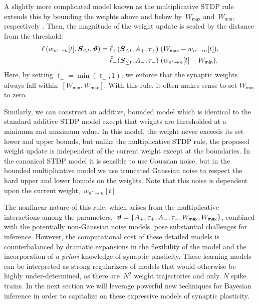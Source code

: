 A slightly more complicated model known as the multiplicative STDP
rule extends this by bounding the weights above and below
by~$W_{\mathsf{max}}$ and~$W_{\mathsf{min}}$, respectively
\citep{Morrison-2008}. Then, the magnitude of the weight update is
scaled by the distance from the threshold:
\begin{align}
 \label{eqn:MultSTDP}
 \ell\left(w_{n' \to n}[t], \boldsymbol{S}_{\leq t}, \boldsymbol{\vartheta} \right) = 
     &\;\tilde\ell_+(\boldsymbol{S}_{\leq t}, A_+, \tau_+) \; (W_{\mathsf{max}}-w_{n'\to n}[t]), \nonumber \\
   - &\;\tilde\ell_-(\boldsymbol{S}_{\leq t}, A_-, \tau_-) \; (w_{n'\to n}[t]-W_{\mathsf{min}}).
\end{align}
Here, by setting ${\tilde\ell_\pm = \min(\ell_\pm,1)}$, we enforce
that the synaptic weights always fall
within~${[W_{\mathsf{min}}, W_{\mathsf{max}}]}$. With this rule, it
often makes sense to set $W_{\mathsf{min}}$ to zero.

Similarly, we can construct an additive, bounded model which is
identical to the standard additive STDP model except that weights are
thresholded at a minimum and maximum value. In this model, the weight
never exceeds its set lower and upper bounds, but unlike the
multiplicative STDP rule, the proposed weight update is independent of
the current weight except at the boundaries. In the canonical STDP
model it is sensible to use Gaussian noise, but in the bounded
multiplicative model we use truncated Gaussian noise to respect the
hard upper and lower bounds on the weights.  Note that this noise is
dependent upon the current weight,~$w_{n'\to n}[t]$.

The nonlinear nature of this rule, which arises from the
multiplicative interactions among the parameters,~${\boldsymbol{\vartheta} =
  \{A_+,\tau_+,A_-,\tau_-,W_{\mathsf{max}}, W_{\mathsf{max}}\}}$,
combined with the potentially non-Gaussian noise models, pose
substantial challenges for inference. However, the computational cost
of these detailed models is counterbalanced by dramatic expansions in
the flexibility of the model and the incorporation of \emph{a priori}
knowledge of synaptic plasticity. These learning models can be
interpreted as strong regularizers of models that would otherwise be
highly under-determined, as there are~$N^2$ weight trajectories and
only~$N$ spike trains. In the next section we will leverage powerful
new techniques for Bayesian inference in order to capitalize on these
expressive models of synaptic plasticity.

